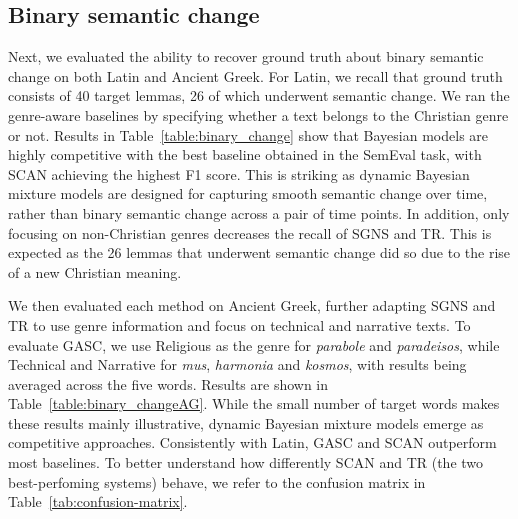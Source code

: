 \documentclass[output=paper%
]{langscibook}
\begin{document}
\subsection{Binary semantic change}
\label{binary-eval}
Next, we evaluated the ability to recover ground truth about binary semantic change on both Latin and Ancient Greek. For Latin, we recall that ground truth consists of 40 target lemmas, 26 of which underwent semantic change. We ran the genre-aware baselines by specifying whether a text belongs to the Christian genre or not. Results in Table~\ref{table:binary_change} show that Bayesian models are highly competitive with the best baseline obtained in the SemEval task, with SCAN achieving the highest F1 score. This is striking as dynamic Bayesian mixture models are designed for capturing smooth semantic change over time, rather than binary semantic change across a pair of time points. In addition, only focusing on non-Christian genres decreases the recall of SGNS and TR. This is expected as the 26 lemmas that underwent semantic change did so due to the rise of a new Christian meaning. 

We then evaluated each method on Ancient Greek, further adapting SGNS and TR to use genre information and focus on technical and narrative texts. To evaluate GASC, we use Religious as the genre for \emph{parabole} and \emph{paradeisos}, while Technical and Narrative for \emph{mus}, \emph{harmonia} and \emph{kosmos}, with results being averaged across the five words. Results are shown in Table~\ref{table:binary_changeAG}. While the small number of target words makes these results mainly illustrative, dynamic Bayesian mixture models emerge as competitive approaches. Consistently with Latin, GASC and SCAN outperform most baselines.
To better understand how differently SCAN and TR (the two best-perfoming systems) behave, we refer to the confusion matrix in Table~\ref{tab:confusion-matrix}.
\end{document}
